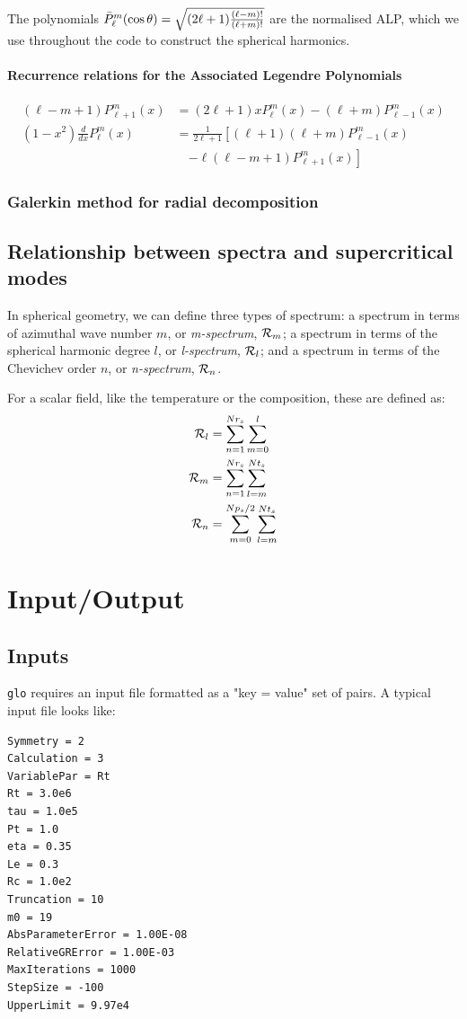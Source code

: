 \documentclass[a4paper,10pt]{book}
\begin{document}
The polynomials $\bar{P}_\ell^m ( \cos{\theta} ) = \sqrt{{(2\ell+1) }{(\ell-m)!\over (\ell+m)!}}$
are the normalised ALP, which we use throughout the code to construct the spherical harmonics.


\subsubsection{Recurrence relations for the Associated Legendre Polynomials}
\begin{align}
 (\ell-m+1)P_{\ell+1}^{m}(x) &= (2\ell+1)xP_{\ell}^{m}(x) - (\ell+m)P_{\ell-1}^{m}(x)\\
 (1-x^2)\frac{d}{dx}{P_\ell^m}(x) &= \frac1{2\ell+1}
  \left[ (\ell+1)(\ell+m)P_{\ell-1}^m(x) \right. \nonumber \\
   &\quad \left. - \ell(\ell-m+1)P_{\ell+1}^m(x) \right]
\end{align}

\subsection{Galerkin method for radial decomposition}

\section{Relationship between spectra and supercritical modes}
\label{s:spectra_defs}
In spherical geometry, we can define three types of spectrum: a spectrum in
terms of azimuthal wave number $m$, or {\em m-spectrum}, ${\cal R}_m$; a
spectrum in terms of the spherical harmonic degree $l$, or {\em l-spectrum},
${\cal R}_l$; and a spectrum in terms of the Chevichev order $n$, or
{\em n-spectrum}, ${\cal R}_n$.

For a scalar field, like the temperature or the composition, these are defined
as:
\begin{align}
{\cal R}_l & = \sum_{n=1}^{Nr_s}\sum_{m=0}^l  \\
{\cal R}_m & = \sum_{n=1}^{Nr_s}\sum_{l=m}^{Nt_s}  \\
{\cal R}_n & = \sum_{m=0}^{Np_s/2}\sum_{l=m}^{Nt_s}
\end{align}

\chapter{Input/Output}

\section{Inputs}
\label{s:inputs}
\verb|glo| requires an input file formatted as a "key =  value" set of pairs.
A typical input file looks like:
\begin{verbatim}
Symmetry = 2
Calculation = 3
VariablePar = Rt
Rt = 3.0e6 
tau = 1.0e5 
Pt = 1.0 
eta = 0.35 
Le = 0.3 
Rc = 1.0e2
Truncation = 10 
m0 = 19
AbsParameterError = 1.00E-08 
RelativeGRError = 1.00E-03 
MaxIterations = 1000
StepSize = -100 
UpperLimit = 9.97e4
\end{verbatim}
\end{document}
